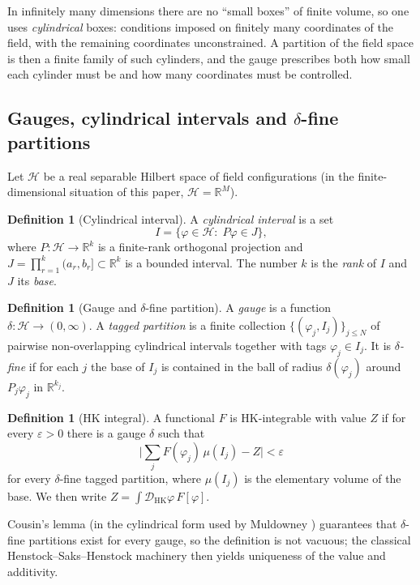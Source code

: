 \documentclass[11pt,a4paper]{article}
\theoremstyle{plain}
\theoremstyle{definition}
\newtheorem{definition}[theorem]{Definition}
\theoremstyle{remark}
\newcommand{\dhk}{\mathcal{D}_{\mathrm{HK}}\varphi}
\newcommand{\R}{\mathbb{R}}
\begin{document}
In infinitely many dimensions there are no ``small boxes'' of finite volume, so one uses
\emph{cylindrical} boxes: conditions imposed on finitely many coordinates of the field,
with the remaining coordinates unconstrained. A partition of the field space is then a
finite family of such cylinders, and the gauge prescribes both how small each cylinder
must be and how many coordinates must be controlled.

\subsection{Gauges, cylindrical intervals and $\delta$-fine partitions}

Let $\mathcal{H}$ be a real separable Hilbert space of field configurations (in the
finite-dimensional situation of this paper, $\mathcal{H}=\R^{M}$).

\begin{definition}[Cylindrical interval]
A \emph{cylindrical interval} is a set
\[
I=\{\varphi\in\mathcal{H}:\;P\varphi\in J\},
\]
where $P:\mathcal{H}\to\R^{k}$ is a finite-rank orthogonal projection and
$J=\prod_{r=1}^{k}(a_r,b_r]\subset\R^{k}$ is a bounded interval. The number $k$ is the
\emph{rank} of $I$ and $J$ its \emph{base}.
\end{definition}

\begin{definition}[Gauge and $\delta$-fine partition]
A \emph{gauge} is a function $\delta:\mathcal{H}\to(0,\infty)$. A \emph{tagged partition}
is a finite collection $\{(\varphi_j,I_j)\}_{j\le N}$ of pairwise non-overlapping
cylindrical intervals together with tags $\varphi_j\in I_j$. It is \emph{$\delta$-fine}
if for each $j$ the base of $I_j$ is contained in the ball of radius
$\delta(\varphi_j)$ around $P_j\varphi_j$ in $\R^{k_j}$.
\end{definition}

\begin{definition}[HK integral]
A functional $F$ is HK-integrable with value $Z$ if for every $\varepsilon>0$ there is a
gauge $\delta$ such that
\[
\Big|\sum_{j} F(\varphi_j)\,\mu(I_j)-Z\Big|<\varepsilon
\]
for every $\delta$-fine tagged partition, where $\mu(I_j)$ is the elementary volume of
the base. We then write $Z=\int\dhk\,F[\varphi]$.
\end{definition}

Cousin's lemma (in the cylindrical form used by Muldowney \cite{Muldowney2012}) guarantees
that $\delta$-fine partitions exist for every gauge, so the definition is not vacuous;
the classical Henstock--Saks--Henstock machinery then yields uniqueness of the value and
additivity.
\end{document}
